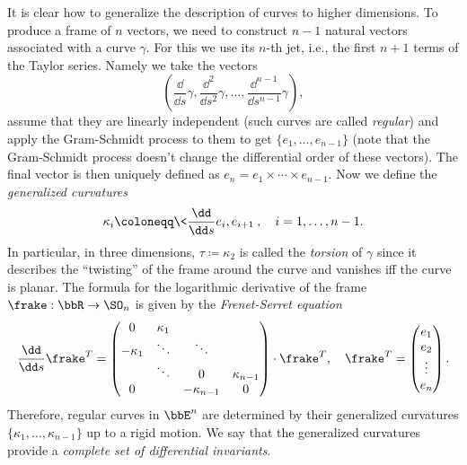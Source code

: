 \begin{example}\label{ex serret-frenet}
    It is clear how to generalize the description of curves to higher dimensions. To produce a frame of $n$ vectors, we need to construct $n-1$ natural vectors associated with a curve $\gamma$. For this we use its $n$-th jet, i.e., the first $n+1$ terms of the Taylor series. Namely we take the vectors 
    \[\left(\frac{\dd}{\dd s}\gamma,\frac{\dd^2}{\dd s^2}\gamma,\ldots,\frac{\dd^{n-1}}{\dd s^{n-1}}\gamma\right),\] assume that they are linearly independent (such curves are called \emph{regular}) and apply the Gram-Schmidt process to them to get $\{e_1,\ldots,e_{n-1}\}$ (note that the Gram-Schmidt process doesn't change the differential order of these vectors). The final vector is then uniquely defined as $e_n=e_1\times\cdots\times e_{n-1}$. Now we define the \emph{generalized curvatures}
    \[\kappa_i\coloneqq \<\frac{\dd}{\dd s}e_i,e_{i+1}\>,\quad i=1,\ldots,n-1.\] 
    In particular, in three dimensions, $\tau\coloneqq \kappa_2$ is called the \emph{torsion} of $\gamma$ since it describes the ``twisting'' of the frame around the curve and vanishes iff the curve is planar. The formula for the logarithmic derivative of the frame $\frake:\bbR\to \SO_n$ is given by the \emph{Frenet-Serret equation}
    \[\frac{\dd}{\dd s}\frake^T=\begin{pmatrix}
        0 & \kappa_1 & &\\
        -\kappa_1 &\ddots & \ddots&\\
         & \ddots &0 &\kappa_{n-1}\\
         0 & &-\kappa_{n-1} & 0
    \end{pmatrix}\cdot \frake^T,\quad 
    \frake^T=\begin{pmatrix}
        e_1 \\e_2 \\ \vdots \\ e_n
    \end{pmatrix}.
    \]
    Therefore, regular curves in $\bbE^n$ are determined by their generalized curvatures $\{\kappa_1,\ldots,\kappa_{n-1}\}$ up to a rigid motion. We say that the generalized curvatures provide a \emph{complete set of differential invariants}.
\end{example}

